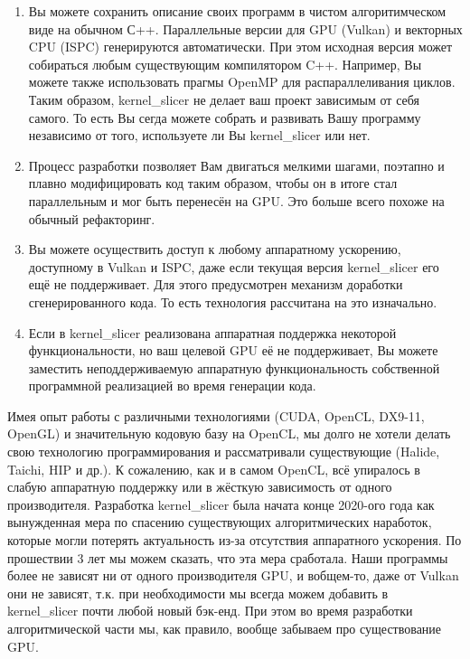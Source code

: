 \documentclass[11pt,fleqn,english,russian]{report} %
\begin{document}
\begin{enumerate}

\item Вы можете сохранить описание своих программ в чистом алгоритимческом виде на обычном С++. Параллельные версии для GPU (Vulkan) и векторных CPU (ISPC) генерируются автоматически. При этом исходная версия может собираться любым существующим компилятором C++. Например, Вы можете также использовать прагмы OpenMP для распараллеливания циклов. Таким образом, kernel\_slicer не делает ваш проект зависимым от себя самого. То есть Вы сегда можете собрать и развивать Вашу программу независимо от того, используете ли Вы kernel\_slicer или нет.

\item Процесс разработки позволяет Вам двигаться мелкими шагами, поэтапно и плавно модифицировать код таким образом, чтобы он в итоге стал параллельным и мог быть перенесён на GPU. Это больше всего похоже на обычный рефакторинг.

\item Вы можете осуществить доступ к любому аппаратному ускорению, доступному в Vulkan и ISPC, даже если текущая версия kernel\_slicer его ещё не поддерживает. Для этого предусмотрен механизм доработки сгенерированного кода. То есть технология рассчитана на это изначально.

\item Если в kernel\_slicer реализована аппаратная поддержка некоторой функциональности, но ваш целевой GPU её не поддерживает, Вы можете заместить неподдерживаемую аппаратную функциональность собственной программной реализацией во время генерации кода.
\end{enumerate}

\begin{remark}Имея опыт работы с различными технологиями (CUDA, OpenCL, DX9-11, OpenGL) и значительную кодовую базу на OpenCL, мы долго не хотели делать свою технологию программирования и рассматривали существующие (Halide, Taichi, HIP и др.). К сожалению, как и в самом OpenCL, всё упиралось в слабую аппаратную поддержку или в жёсткую зависимость от одного производителя. Разработка kernel\_slicer была начата конце 2020-ого года как вынужденная мера по спасению существующих алгоритмических наработок, которые могли потерять актуальность из-за отсутствия аппаратного ускорения. По прошествии 3 лет мы можем сказать, что эта мера сработала. Наши программы более не зависят ни от одного производителя GPU, и вобщем-то, даже от Vulkan они не зависят, т.к. при необходимости мы всегда можем добавить в kernel\_slicer почти любой новый бэк-енд. При этом во время разработки алгоритмической части мы, как правило, вообще забываем про существование GPU.
\end{remark}
\end{document}
